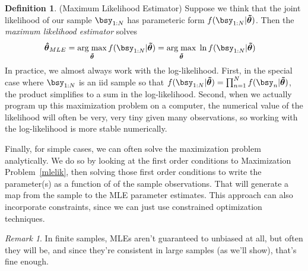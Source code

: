 \documentclass[12pt]{article}
\theoremstyle{plain}
\theoremstyle{definition}
\newtheorem{defn}[thm]{Definition}
\theoremstyle{remark}
\newtheorem*{rmk}{Remark}
\newcommand{\bshattheta}{\boldsymbol{\hat{\theta}}}
\newcommand{\bstildetheta}{\boldsymbol{\tilde{\theta}}}
\DeclareMathOperator*{\argmax}{arg\;max}
\newcommand{\nN}{_{n=1}^N}
\begin{document}
\begin{defn}(Maximum Likelihood Estimator)
Suppose we think that the joint likelihood of our sample $\bsy_{1:N}$
has parameteric form $f(\bsy_{1:N}|\bstildetheta)$. Then the
\emph{maximum likelihood estimator} solves
\begin{align}
  \bshattheta_{MLE}
  &=
  \argmax_{\bstildetheta} f(\bsy_{1:N}|\bstildetheta)
  =
  \argmax_{\bstildetheta}\;
  \ln f(\bsy_{1:N}|\bstildetheta)
  \label{mlelik}
\end{align}
In practice, we almost always work with the log-likelihood. First, in
the special case where $\bsy_{1:N}$ is an iid sample so that
$f(\bsy_{1:N}|\bstildetheta)=\prod\nN f(\bsy_n|\bstildetheta)$, the
product simplifies to a sum in the log-likelihood. Second, when we
actually program up this maximization problem on a computer, the
numerical value of the likelihood will often be very, very tiny given
many observations, so working with the log-likelihood is more stable
numerically.

Finally, for simple cases, we can often solve the maximization problem
analytically. We do so by looking at the first order conditions to
Maximization Problem~\ref{mlelik}, then solving those first order
conditions to write the parameter(s) as a function of of the sample
observations. That will generate a map from the sample to the MLE
parameter estimates. This approach can also incorporate constraints,
since we can just use constrained optimization techniques.
\end{defn}
\begin{rmk}
In finite samples, MLEs aren't guaranteed to unbiased at all, but often
they will be, and since they're consistent in large samples (as we'll
show), that's fine enough.
\end{rmk}
\end{document}
